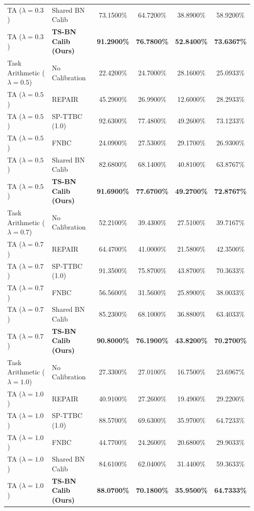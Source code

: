 \documentclass{article}
\theoremstyle{plain}
\theoremstyle{definition}
\theoremstyle{remark}
\begin{document}
\begin{table}[t]
\begin{center}
\begin{small}
\begin{tabular}{llcccc}
TA ($\lambda=0.3$) & Shared BN Calib & 73.1500\% & 64.7200\% & 38.8900\% & 58.9200\% \\
TA ($\lambda=0.3$) & \textbf{TS-BN Calib (Ours)} & \textbf{91.2900\%} & \textbf{76.7800\%} & \textbf{52.8400\%} & \textbf{73.6367\%} \\
\midrule
Task Arithmetic ($\lambda=0.5$) & No Calibration & 22.4200\% & 24.7000\% & 28.1600\% & 25.0933\% \\
TA ($\lambda=0.5$) & REPAIR & 45.2900\% & 26.9900\% & 12.6000\% & 28.2933\% \\
TA ($\lambda=0.5$) & SP-TTBC (1.0) & 92.6300\% & 77.4800\% & 49.2600\% & 73.1233\% \\
TA ($\lambda=0.5$) & FNBC & 24.0900\% & 27.5300\% & 29.1700\% & 26.9300\% \\
TA ($\lambda=0.5$) & Shared BN Calib & 82.6800\% & 68.1400\% & 40.8100\% & 63.8767\% \\
TA ($\lambda=0.5$) & \textbf{TS-BN Calib (Ours)} & \textbf{91.6900\%} & \textbf{77.6700\%} & \textbf{49.2700\%} & \textbf{72.8767\%} \\
\midrule
Task Arithmetic ($\lambda=0.7$) & No Calibration & 52.2100\% & 39.4300\% & 27.5100\% & 39.7167\% \\
TA ($\lambda=0.7$) & REPAIR & 64.4700\% & 41.0000\% & 21.5800\% & 42.3500\% \\
TA ($\lambda=0.7$) & SP-TTBC (1.0) & 91.3500\% & 75.8700\% & 43.8700\% & 70.3633\% \\
TA ($\lambda=0.7$) & FNBC & 56.5600\% & 31.5600\% & 25.8900\% & 38.0033\% \\
TA ($\lambda=0.7$) & Shared BN Calib & 85.2300\% & 68.1000\% & 36.8800\% & 63.4033\% \\
TA ($\lambda=0.7$) & \textbf{TS-BN Calib (Ours)} & \textbf{90.8000\%} & \textbf{76.1900\%} & \textbf{43.8200\%} & \textbf{70.2700\%} \\
\midrule
Task Arithmetic ($\lambda=1.0$) & No Calibration & 27.3300\% & 27.0100\% & 16.7500\% & 23.6967\% \\
TA ($\lambda=1.0$) & REPAIR & 40.9100\% & 27.2600\% & 19.4900\% & 29.2200\% \\
TA ($\lambda=1.0$) & SP-TTBC (1.0) & 88.5700\% & 69.6300\% & 35.9700\% & 64.7233\% \\
TA ($\lambda=1.0$) & FNBC & 44.7700\% & 24.2600\% & 20.6800\% & 29.9033\% \\
TA ($\lambda=1.0$) & Shared BN Calib & 84.6100\% & 62.0400\% & 31.4400\% & 59.3633\% \\
TA ($\lambda=1.0$) & \textbf{TS-BN Calib (Ours)} & \textbf{88.0700\%} & \textbf{70.1800\%} & \textbf{35.9500\%} & \textbf{64.7333\%} \\
\bottomrule
\end{tabular}
\end{small}
\end{center}
\vskip -0.1in
\end{table}
\end{document}
